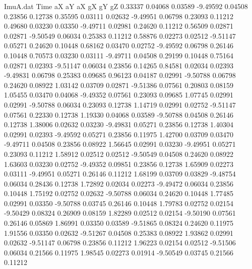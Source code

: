 \begin{filecontents}{ImuA.dat}
Time aX aY aX gX gY gZ
   0.33337    0.04068    0.03589   -9.49592    0.04508    0.23856    0.12738
   0.35595    0.03111    0.02632   -9.49951    0.06798    0.23093    0.11212
   0.49680    0.03230    0.03350   -9.49711    0.02981    0.24620    0.11212
   0.56509    0.02871    0.02871   -9.50549    0.06034    0.25383    0.11212
   0.58876    0.02273    0.02512   -9.51147    0.05271    0.24620    0.10448
   0.68162    0.03470    0.02752   -9.49592    0.06798    0.26146    0.10448
   0.70573    0.03230    0.03111   -9.49711    0.04508    0.29199    0.10448
   0.75164    0.02871    0.02393   -9.51147    0.06034    0.23856    0.14265
   0.84581    0.02034    0.02393   -9.49831    0.06798    0.25383    0.09685
   0.96123    0.04187    0.02991   -9.50788    0.06798    0.24620    0.08922
   1.03142    0.03709    0.02871   -9.51386    0.07561    0.20803    0.08159
   1.05455    0.03470    0.04068   -9.49352    0.07561    0.23093    0.09685
   1.07745    0.02991    0.02991   -9.50788    0.06034    0.23093    0.12738
   1.14719    0.02991    0.02752   -9.51147    0.07561    0.22330    0.12738
   1.19330    0.04068    0.03589   -9.50788    0.04508    0.26146    0.12738
   1.38006    0.02632    0.03230   -9.49831    0.05271    0.23856    0.12738
   1.40304    0.02991    0.02393   -9.49592    0.05271    0.23856    0.11975
   1.42700    0.03709    0.03470   -9.49711    0.04508    0.23856    0.08922
   1.56645    0.02991    0.03230   -9.49951    0.05271    0.23093    0.11212
   1.58912    0.02512    0.02512   -9.50549    0.04508    0.24620    0.08922
   1.63603    0.03230    0.02752   -9.49352    0.09851    0.23856    0.12738
   1.65909    0.02273    0.03111   -9.49951    0.05271    0.26146    0.11212
   1.68199    0.03709    0.03829   -9.48754    0.06034    0.28436    0.12738
   1.72892    0.02034    0.02273   -9.49472    0.06034    0.23856    0.10448
   1.75192    0.02752    0.02632   -9.50788    0.06034    0.24620    0.10448
   1.77485    0.02991    0.03350   -9.50788    0.03745    0.26146    0.10448
   1.79783    0.02752    0.02154   -9.50429    0.08324    0.26909    0.08159
   1.82289    0.02512    0.02154   -9.50190    0.07561    0.26146    0.05869
   1.86991    0.03350    0.03589   -9.51865    0.08324    0.24620    0.11975
   1.91556    0.03350    0.02632   -9.51267    0.04508    0.25383    0.08922
   1.93862    0.02991    0.02632   -9.51147    0.06798    0.23856    0.11212
   1.96223    0.02154    0.02512   -9.51506    0.06034    0.21566    0.11975
   1.98545    0.02273    0.01914   -9.50549    0.03745    0.21566    0.11212

\end{filecontents}
